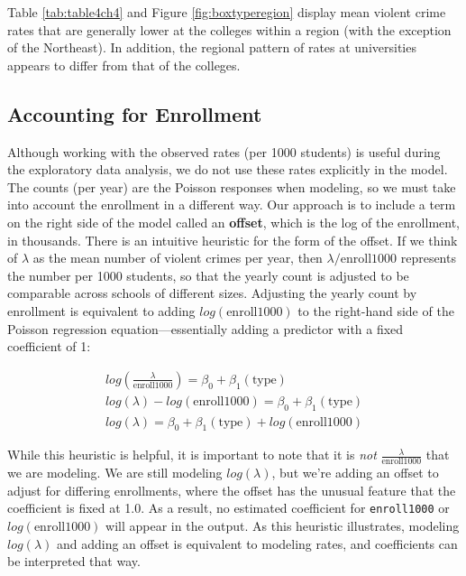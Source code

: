 \documentclass[
]{krantz}
\begin{document}
Table \ref{tab:table4ch4} and Figure \ref{fig:boxtyperegion} display mean violent crime rates that are generally lower at the colleges within a region (with the exception of the Northeast). In addition, the regional pattern of rates at universities appears to differ from that of the colleges.

\subsection{Accounting for Enrollment}\label{accounting-for-enrollment}

Although working with the observed rates (per 1000 students) is useful during the exploratory data analysis, we do not use these rates explicitly in the model. The counts (per year) are the Poisson responses when modeling, so we must take into account the enrollment in a different way. Our approach is to include a term on the right side of the model called an \textbf{offset},  which is the log of the enrollment, in thousands. There is an intuitive heuristic for the form of the offset. If we think of \(\lambda\) as the mean number of violent crimes per year, then \(\lambda/\textrm{enroll1000}\) represents the number per 1000 students, so that the yearly count is adjusted to be comparable across schools of different sizes. Adjusting the yearly count by enrollment is equivalent to adding \(log(\textrm{enroll1000})\) to the right-hand side of the Poisson regression equation---essentially adding a predictor with a fixed coefficient of 1:

\begin{align*} 
log(\frac{\lambda}{\textrm{enroll1000}} )= \beta_0 + \beta_1(\textrm{type}) \nonumber \\
log(\lambda)-log(\textrm{enroll1000}) = \beta_0 + \beta_1(\textrm{type}) \nonumber \\
log(\lambda) = \beta_0 + \beta_1(\textrm{type}) + log(\textrm{enroll1000})
\end{align*}

While this heuristic is helpful, it is important to note that it is \emph{not} \(\frac{\lambda}{ \textrm{enroll1000}}\) that we are modeling. We are still modeling \(log(\lambda)\), but we're adding an offset to adjust for differing enrollments, where the offset has the unusual feature that the coefficient is fixed at 1.0. As a result, no estimated coefficient for \texttt{enroll1000} or \(log(\textrm{enroll1000})\) will appear in the output. As this heuristic illustrates, modeling \(log(\lambda)\) and adding an offset is equivalent to modeling rates, and coefficients can be interpreted that way.
\end{document}
